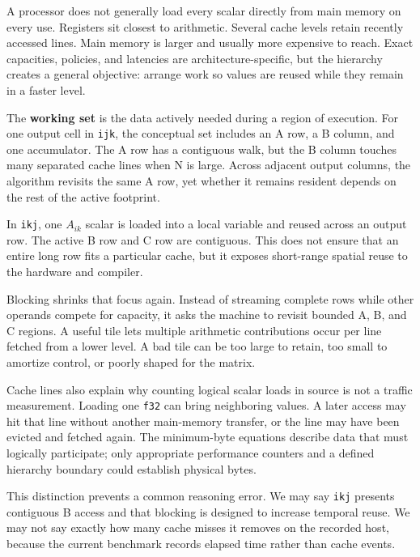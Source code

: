 
A processor does not generally load every scalar directly from main
memory on every use. Registers sit closest to arithmetic. Several cache
levels retain recently accessed lines. Main memory is larger and usually
more expensive to reach. Exact capacities, policies, and latencies are
architecture-specific, but the hierarchy creates a general objective:
arrange work so values are reused while they remain in a faster level.

The \textbf{working set} is the data actively needed during a region of
execution. For one output cell in \texttt{ijk}, the conceptual set
includes an A row, a B column, and one accumulator. The A row has a
contiguous walk, but the B column touches many separated cache lines
when N is large. Across adjacent output columns, the algorithm revisits
the same A row, yet whether it remains resident depends on the rest of
the active footprint.

In \texttt{ikj}, one \(A_{ik}\) scalar is loaded into a local variable
and reused across an output row. The active B row and C row are
contiguous. This does not ensure that an entire long row fits a
particular cache, but it exposes short-range spatial reuse to the
hardware and compiler.

Blocking shrinks that focus again. Instead of streaming complete rows
while other operands compete for capacity, it asks the machine to
revisit bounded A, B, and C regions. A useful tile lets multiple
arithmetic contributions occur per line fetched from a lower level. A
bad tile can be too large to retain, too small to amortize control, or
poorly shaped for the matrix.

Cache lines also explain why counting logical scalar loads in source is
not a traffic measurement. Loading one \texttt{f32} can bring
neighboring values. A later access may hit that line without another
main-memory transfer, or the line may have been evicted and fetched
again. The minimum-byte equations describe data that must logically
participate; only appropriate performance counters and a defined
hierarchy boundary could establish physical bytes.

This distinction prevents a common reasoning error. We may say
\texttt{ikj} presents contiguous B access and that blocking is designed
to increase temporal reuse. We may not say exactly how many cache misses
it removes on the recorded host, because the current benchmark records
elapsed time rather than cache events.


